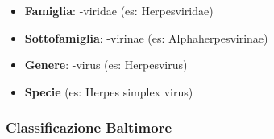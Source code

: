 \documentclass[italian,]{article}
\providecommand{\tightlist}{%
  \setlength{\itemsep}{0pt}\setlength{\parskip}{0pt}}
\newcommand{\normalbox}[2]{\begin{tcolorbox}[title=#1]#2\end{tcolorbox}} %
\begin{document}
\normalbox{Sistematica}{
\begin{itemize}
\tightlist
\item \textbf{Famiglia}: -viridae (es: Herpesviridae)
\item \textbf{Sottofamiglia}: -virinae (es: Alphaherpesvirinae)
\item \textbf{Genere}: -virus (es: Herpesvirus)
\item \textbf{Specie} (es: Herpes simplex virus)
\end{itemize}
}

\hypertarget{classificazione-baltimore}{%
\subsubsection{Classificazione
Baltimore}\label{classificazione-baltimore}}
\end{document}
